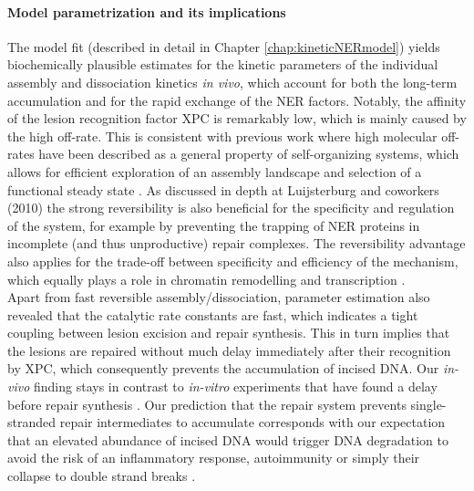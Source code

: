\paragraph{Model parametrization and its implications}
The model fit (described in detail in Chapter \ref{chap:kineticNERmodel}) yields biochemically plausible estimates for the kinetic parameters of the individual assembly and dissociation kinetics \textit{in vivo}, which account for both the long-term accumulation and for the rapid exchange of the NER factors. Notably, the affinity of the lesion recognition factor XPC is remarkably low, which is mainly caused by the high off-rate. This is consistent with previous work where high molecular off-rates have been described as a general property of self-organizing systems, which allows for efficient exploration of an assembly landscape and selection of a functional steady state \cite{Kirschner2000}. As discussed in depth at Luijsterburg and coworkers (2010)\cite{Luijsterburg2010} the strong reversibility is also beneficial for the specificity and regulation of the system, for example by preventing the trapping of NER proteins in incomplete (and thus unproductive) repair complexes. The reversibility advantage also applies for the trade-off between specificity and efficiency of the mechanism, which equally plays a role in chromatin remodelling and transcription \cite{Cook2010,Voss2011}.\\
Apart from fast reversible assembly/dissociation, parameter estimation also revealed that the catalytic rate constants are fast, which indicates a tight coupling between lesion excision and repair synthesis. This in turn implies that the lesions are repaired without much delay immediately after their recognition by XPC, which consequently prevents the accumulation of incised DNA. Our \textit{in-vivo} finding stays in contrast to \textit{in-vitro} experiments that have found a delay before repair synthesis \cite{Mocquet2008,Riedl2003}. Our prediction that the repair system prevents single-stranded repair intermediates to accumulate corresponds with our expectation that an elevated abundance of incised DNA would trigger DNA degradation to avoid the risk of an inflammatory response, autoimmunity \cite{Takeuchi2010} or simply their collapse to double strand breaks \cite{Mocquet2008}.             



